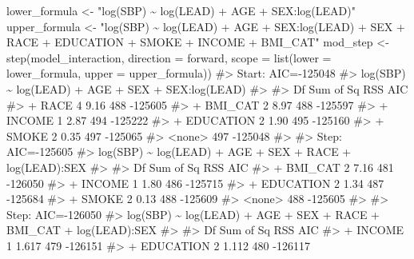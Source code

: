 \documentclass[
  letterpaper,
]{krantz}
\makeatletter
\newenvironment{Shaded}{\begin{snugshade}}{\end{snugshade}}
\newcommand{\AttributeTok}[1]{\textcolor[rgb]{0.40,0.45,0.13}{#1}}
\newcommand{\CommentTok}[1]{\textcolor[rgb]{0.37,0.37,0.37}{#1}}
\newcommand{\FunctionTok}[1]{\textcolor[rgb]{0.28,0.35,0.67}{#1}}
\newcommand{\NormalTok}[1]{\textcolor[rgb]{0.00,0.23,0.31}{#1}}
\newcommand{\OtherTok}[1]{\textcolor[rgb]{0.00,0.23,0.31}{#1}}
\newcommand{\StringTok}[1]{\textcolor[rgb]{0.13,0.47,0.30}{#1}}
\newenvironment{kframe}{%
\medskip{}
\setlength{\fboxsep}{.8em}
 \def\at@end@of@kframe{}%
 \ifinner\ifhmode%
  \def\at@end@of@kframe{\end{minipage}}%
  \begin{minipage}{\columnwidth}%
 \fi\fi%
 \def\FrameCommand##1{\hskip\@totalleftmargin \hskip-\fboxsep
 \colorbox{shadecolor}{##1}\hskip-\fboxsep
     \hskip-\linewidth \hskip-\@totalleftmargin \hskip\columnwidth}%
 \MakeFramed {\advance\hsize-\width
   \@totalleftmargin\z@ \linewidth\hsize
   \@setminipage}}%
 {\par\unskip\endMakeFramed%
 \at@end@of@kframe}
\renewenvironment{Shaded}{\begin{kframe}}{\end{kframe}}
\makeatother
\begin{document}
\begin{Shaded}
\begin{Highlighting}[]
\NormalTok{lower\_formula }\OtherTok{\textless{}{-}} \StringTok{"log(SBP) \textasciitilde{} log(LEAD) + AGE + SEX:log(LEAD)"}
\NormalTok{upper\_formula }\OtherTok{\textless{}{-}} \StringTok{"log(SBP) \textasciitilde{} log(LEAD) + AGE + SEX:log(LEAD) + SEX + RACE + }
\StringTok{  EDUCATION + SMOKE + INCOME + BMI\_CAT"}
\NormalTok{mod\_step }\OtherTok{\textless{}{-}} \FunctionTok{step}\NormalTok{(model\_interaction, }\AttributeTok{direction =} \StringTok{\textquotesingle{}forward\textquotesingle{}}\NormalTok{, }
                 \AttributeTok{scope =} \FunctionTok{list}\NormalTok{(}\AttributeTok{lower =}\NormalTok{ lower\_formula, }
                              \AttributeTok{upper =}\NormalTok{ upper\_formula))}
\CommentTok{\#\textgreater{} Start:  AIC={-}125048}
\CommentTok{\#\textgreater{} log(SBP) \textasciitilde{} log(LEAD) + AGE + SEX + SEX:log(LEAD)}
\CommentTok{\#\textgreater{} }
\CommentTok{\#\textgreater{}             Df Sum of Sq RSS     AIC}
\CommentTok{\#\textgreater{} + RACE       4      9.16 488 {-}125605}
\CommentTok{\#\textgreater{} + BMI\_CAT    2      8.97 488 {-}125597}
\CommentTok{\#\textgreater{} + INCOME     1      2.87 494 {-}125222}
\CommentTok{\#\textgreater{} + EDUCATION  2      1.90 495 {-}125160}
\CommentTok{\#\textgreater{} + SMOKE      2      0.35 497 {-}125065}
\CommentTok{\#\textgreater{} \textless{}none\textgreater{}                   497 {-}125048}
\CommentTok{\#\textgreater{} }
\CommentTok{\#\textgreater{} Step:  AIC={-}125605}
\CommentTok{\#\textgreater{} log(SBP) \textasciitilde{} log(LEAD) + AGE + SEX + RACE + log(LEAD):SEX}
\CommentTok{\#\textgreater{} }
\CommentTok{\#\textgreater{}             Df Sum of Sq RSS     AIC}
\CommentTok{\#\textgreater{} + BMI\_CAT    2      7.16 481 {-}126050}
\CommentTok{\#\textgreater{} + INCOME     1      1.80 486 {-}125715}
\CommentTok{\#\textgreater{} + EDUCATION  2      1.34 487 {-}125684}
\CommentTok{\#\textgreater{} + SMOKE      2      0.13 488 {-}125609}
\CommentTok{\#\textgreater{} \textless{}none\textgreater{}                   488 {-}125605}
\CommentTok{\#\textgreater{} }
\CommentTok{\#\textgreater{} Step:  AIC={-}126050}
\CommentTok{\#\textgreater{} log(SBP) \textasciitilde{} log(LEAD) + AGE + SEX + RACE + BMI\_CAT + log(LEAD):SEX}
\CommentTok{\#\textgreater{} }
\CommentTok{\#\textgreater{}             Df Sum of Sq RSS     AIC}
\CommentTok{\#\textgreater{} + INCOME     1     1.617 479 {-}126151}
\CommentTok{\#\textgreater{} + EDUCATION  2     1.112 480 {-}126117}

\end{Highlighting}
\end{Shaded}
\end{document}
